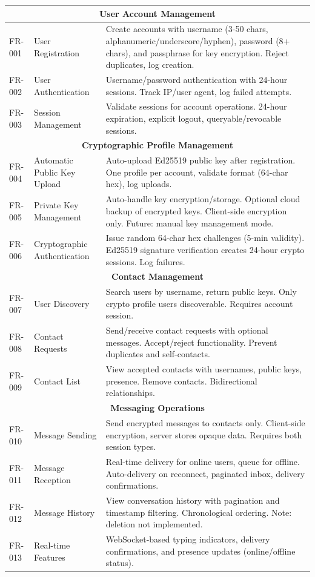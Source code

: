 \documentclass[12pt,a4paper,openany]{book}
\begin{document}
\begin{longtable}{|p{2cm}|p{4cm}|p{8cm}|}
\multicolumn{3}{|c|}{\textbf{User Account Management}} \\
\hline
FR-001 & User Registration & Create accounts with username (3-50 chars, alphanumeric/underscore/hyphen), password (8+ chars), and passphrase for key encryption. Reject duplicates, log creation. \\
\hline
FR-002 & User Authentication & Username/password authentication with 24-hour sessions. Track IP/user agent, log failed attempts. \\
\hline
FR-003 & Session Management & Validate sessions for account operations. 24-hour expiration, explicit logout, queryable/revocable sessions. \\
\hline
\multicolumn{3}{|c|}{\textbf{Cryptographic Profile Management}} \\
\hline
FR-004 & Automatic Public Key Upload & Auto-upload Ed25519 public key after registration. One profile per account, validate format (64-char hex), log uploads. \\
\hline
FR-005 & Private Key Management & Auto-handle key encryption/storage. Optional cloud backup of encrypted keys. Client-side encryption only. Future: manual key management mode. \\
\hline
FR-006 & Cryptographic Authentication & Issue random 64-char hex challenges (5-min validity). Ed25519 signature verification creates 24-hour crypto sessions. Log failures. \\
\hline
\multicolumn{3}{|c|}{\textbf{Contact Management}} \\
\hline
FR-007 & User Discovery & Search users by username, return public keys. Only crypto profile users discoverable. Requires account session. \\
\hline
FR-008 & Contact Requests & Send/receive contact requests with optional messages. Accept/reject functionality. Prevent duplicates and self-contacts. \\
\hline
FR-009 & Contact List & View accepted contacts with usernames, public keys, presence. Remove contacts. Bidirectional relationships. \\
\hline
\multicolumn{3}{|c|}{\textbf{Messaging Operations}} \\
\hline
FR-010 & Message Sending & Send encrypted messages to contacts only. Client-side encryption, server stores opaque data. Requires both session types. \\
\hline
FR-011 & Message Reception & Real-time delivery for online users, queue for offline. Auto-delivery on reconnect, paginated inbox, delivery confirmations. \\
\hline
FR-012 & Message History & View conversation history with pagination and timestamp filtering. Chronological ordering. Note: deletion not implemented. \\
\hline
FR-013 & Real-time Features & WebSocket-based typing indicators, delivery confirmations, and presence updates (online/offline status). \\
\hline
\end{longtable}
\markboth{\leftmark}{\rightmark} %
\pagestyle{fancy} %
\end{document}
